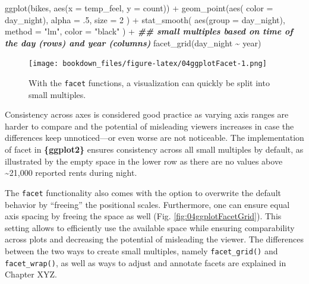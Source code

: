 \documentclass[
]{krantz}
\makeatletter
\newenvironment{Shaded}{\begin{snugshade}}{\end{snugshade}}
\newcommand{\AttributeTok}[1]{\textcolor[rgb]{0.61,0.61,0.61}{#1}}
\newcommand{\DecValTok}[1]{\textcolor[rgb]{0.06,0.06,0.06}{#1}}
\newcommand{\DocumentationTok}[1]{\textcolor[rgb]{0.37,0.37,0.37}{\textbf{\textit{#1}}}}
\newcommand{\FunctionTok}[1]{\textcolor[rgb]{0,0,0}{#1}}
\newcommand{\NormalTok}[1]{#1}
\newcommand{\SpecialCharTok}[1]{\textcolor[rgb]{0,0,0}{#1}}
\newcommand{\StringTok}[1]{\textcolor[rgb]{0.5,0.5,0.5}{#1}}
\newenvironment{kframe}{%
\medskip{}
\setlength{\fboxsep}{.8em}
 \def\at@end@of@kframe{}%
 \ifinner\ifhmode%
  \def\at@end@of@kframe{\end{minipage}}%
  \begin{minipage}{\columnwidth}%
 \fi\fi%
 \def\FrameCommand##1{\hskip\@totalleftmargin \hskip-\fboxsep
 \colorbox{shadecolor}{##1}\hskip-\fboxsep
     \hskip-\linewidth \hskip-\@totalleftmargin \hskip\columnwidth}%
 \MakeFramed {\advance\hsize-\width
   \@totalleftmargin\z@ \linewidth\hsize
   \@setminipage}}%
 {\par\unskip\endMakeFramed%
 \at@end@of@kframe}
\renewenvironment{Shaded}{\begin{kframe}}{\end{kframe}}
\makeatother
\begin{document}
\begin{Shaded}
\begin{Highlighting}[]
\FunctionTok{ggplot}\NormalTok{(bikes, }\FunctionTok{aes}\NormalTok{(}\AttributeTok{x =}\NormalTok{ temp\_feel, }\AttributeTok{y =}\NormalTok{ count)) }\SpecialCharTok{+} 
  \FunctionTok{geom\_point}\NormalTok{(}\FunctionTok{aes}\NormalTok{(}
    \AttributeTok{color =}\NormalTok{ day\_night), }\AttributeTok{alpha =}\NormalTok{ .}\DecValTok{5}\NormalTok{, }\AttributeTok{size =} \DecValTok{2}
\NormalTok{  ) }\SpecialCharTok{+} 
  \FunctionTok{stat\_smooth}\NormalTok{(}
    \FunctionTok{aes}\NormalTok{(}\AttributeTok{group =}\NormalTok{ day\_night), }\AttributeTok{method =} \StringTok{"lm"}\NormalTok{, }\AttributeTok{color =} \StringTok{"black"}
\NormalTok{  ) }\SpecialCharTok{+}
  \DocumentationTok{\#\# small multiples based on time of the day (rows) and year (columns)}
  \FunctionTok{facet\_grid}\NormalTok{(day\_night }\SpecialCharTok{\textasciitilde{}}\NormalTok{ year)}
\end{Highlighting}
\end{Shaded}

\begin{figure}
\centering
\texttt{[image: bookdown\_files/figure-latex/04ggplotFacet-1.png]}
\caption{\label{fig:04ggplotFacet}With the \texttt{facet} functions, a visualization can quickly be split into small multiples.}
\end{figure}

Consistency across axes is considered good practice as varying axis ranges are harder to compare and the potential of misleading viewers increases in case the differences keep unnoticed---or even worse are not noticeable. The implementation of facet in \textbf{\{ggplot2\}} ensures consistency across all small multiples by default, as illustrated by the empty space in the lower row as there are no values above \textasciitilde21,000 reported rents during night.

The \texttt{facet} functionality also comes with the option to overwrite the default behavior by ``freeing'' the positional scales. Furthermore, one can ensure equal axis spacing by freeing the space as well (Fig. \ref{fig:04ggplotFacetGrid}). This setting allows to efficiently use the available space while ensuring comparability across plots and decreasing the potential of misleading the viewer. The differences between the two ways to create small multiples, namely \texttt{facet\_grid()} and \texttt{facet\_wrap()}, as well as ways to adjust and annotate facets are explained in Chapter XYZ.
\end{document}
